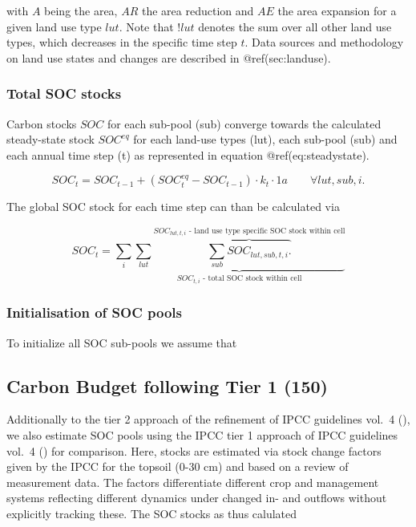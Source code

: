 \documentclass[gc, manuscript]{copernicus}
\begin{document}
with \(A\) being the area, \(AR\) the area reduction and \(AE\) the area
expansion for a given land use type \(lut\). Note that \(!lut\) denotes
the sum over all other land use types, which decreases in the specific
time step \(t\). Data sources and methodology on land use states and
changes are described in @ref(sec:landuse).

\subsubsection{Total SOC stocks}

Carbon stocks \(SOC\) for each sub-pool (sub) converge towards the
calculated steady-state stock \(SOC^{eq}\) for each land-use types
(lut), each sub-pool (sub) and each annual time step (t) as represented
in equation @ref(eq:steadystate).

\begin{equation}
SOC_{t} = SOC_{t-1} + (SOC^{eq}_{t} - SOC_{t-1}) \cdot k_{t} \cdot 1\unit{a} \qquad \forall lut, sub, i.
\label{eq:steadystate}
\end{equation}

The global SOC stock for each time step can than be calculated via

\begin{equation}
SOC_{t} = \sum_{i} \underbrace{\sum_{lut} \overbrace{\sum_{sub} SOC_{lut, sub, t, i}.}^{\text{$SOC_{lut, t, i}$ - land use type specific SOC stock within cell}}}_{\text{$SOC_{t, i}$ - total SOC stock within cell}}
\label{eq:totalstock}
\end{equation}

\subsubsection{Initialisation of SOC pools}

To initialize all SOC sub-pools we assume that

\newpage

\hypertarget{sec:tier1}{%
\subsection{Carbon Budget following Tier 1 (150)}\label{sec:tier1}}

Additionally to the tier 2 approach of the refinement of IPCC guidelines
vol.~4 (\citet{ipcc_2019_2019}), we also estimate SOC pools using the
IPCC tier 1 approach of IPCC guidelines vol.~4 (\citet{ipcc_2006_2006})
for comparison. Here, stocks are estimated via stock change factors
given by the IPCC for the topsoil (0-30 cm) and based on a review of
measurement data. The factors differentiate different crop and
management systems reflecting different dynamics under changed in- and
outflows without explicitly tracking these. The SOC stocks as thus
calulated
\end{document}
